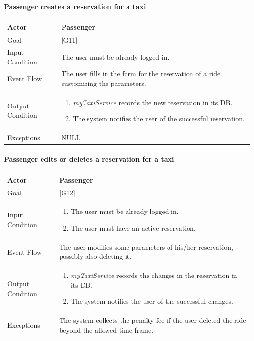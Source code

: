\documentclass[a4paper,11pt]{report} %
\newcommand{\mts}{\mbox{\normalfont\itshape myTaxiService}}
\begin{document}
	\pagebreak
	
	\paragraph{Passenger creates a reservation for a taxi}
	\begin{center}
		\begin{tabular}{| l | p{9cm} |}\hline
			Actor & Passenger\\\hline
			Goal & {[}G11{]} \\\hline
			Input Condition & The user must be already logged in.\\\hline
			Event Flow & The user fills in the form for the reservation of a ride customizing the parameters.\\\hline
			Output Condition & \begin{enumerate}
									\item \mts{} records the new reservation in its DB.
									\item The system notifies the user of the successful reservation.
							   \end{enumerate}\\\hline
			Exceptions & NULL\\\hline
		\end{tabular}
	\end{center}
	
	\pagebreak
	
	\paragraph{Passenger edits or deletes a reservation for a taxi}
	\begin{center}
		\begin{tabular}{| l | p{9cm} |}\hline
			Actor & Passenger\\\hline
			Goal & {[}G12{]} \\\hline
			Input Condition & \begin{enumerate}
									\item The user must be already logged in.
									\item The user must have an active reservation.
							  \end{enumerate}\\\hline
			Event Flow & The user modifies some parameters of his/her reservation, possibly also deleting it.\\\hline
			Output Condition & \begin{enumerate}
									\item \mts{} records the changes in the reservation in its DB.
									\item The system notifies the user of the successful changes.
						   	   \end{enumerate}\\\hline
			Exceptions & The system collects the penalty fee if the user deleted the ride beyond the allowed time-frame.\\\hline
		\end{tabular}
	\end{center}	
	
\end{document}
